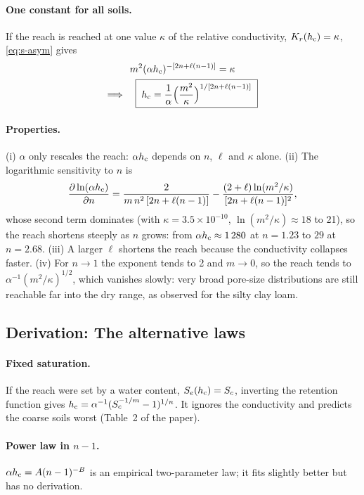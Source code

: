 \paragraph{One constant for all soils.} If the reach is reached at one value $\kappa$ of the relative conductivity, $K_r(h_{\mathrm{c}})=\kappa$, \cref{eq:s-asym} gives
\begin{equation}
\begin{gathered}m^{2}(\alpha h_{\mathrm{c}})^{-[2n+\ell(n-1)]}=\kappa\\ \Longrightarrow\quad \boxed{\;h_{\mathrm{c}}=\frac{1}{\alpha}\Bigl(\frac{m^{2}}{\kappa}\Bigr)^{1/[2n+\ell(n-1)]}\;}\end{gathered} \label{eq:s-hc}
\end{equation}
\paragraph{Properties.} (i) $\alpha$ only rescales the reach: $\alpha h_{\mathrm{c}}$ depends on $n$, $\ell$ and $\kappa$ alone. (ii) The logarithmic sensitivity to $n$ is
\begin{equation}
\frac{\partial\ln(\alpha h_{\mathrm{c}})}{\partial n}=\frac{2}{m\,n^{2}\,[2n+\ell(n-1)]}-\frac{(2+\ell)\ln(m^{2}/\kappa)}{[2n+\ell(n-1)]^{2}},
\end{equation}
whose second term dominates (with $\kappa=3.5\times10^{-10}$, $\ln(m^2/\kappa)\approx18$ to 21), so the reach shortens steeply as $n$ grows: from $\alpha h_{\mathrm{c}}\approx1\,280$ at $n=1.23$ to $29$ at $n=2.68$. (iii) A larger $\ell$ shortens the reach because the conductivity collapses faster. (iv) For $n\to1$ the exponent tends to 2 and $m\to0$, so the reach tends to $\alpha^{-1}(m^{2}/\kappa)^{1/2}$, which vanishes slowly: very broad pore-size distributions are still reachable far into the dry range, as observed for the silty clay loam.


\subsection{Derivation: The alternative laws}\label{der:s4:4}
\paragraph{Fixed saturation.} If the reach were set by a water content, $S_e(h_{\mathrm{c}})=S_c$, inverting the retention function gives $h_{\mathrm{c}}=\alpha^{-1}(S_c^{-1/m}-1)^{1/n}$. It ignores the conductivity and predicts the coarse soils worst (Table~2 of the paper).
\paragraph{Power law in $n-1$.} $\alpha h_{\mathrm{c}}=A(n-1)^{-B}$ is an empirical two-parameter law; it fits slightly better but has no derivation.
